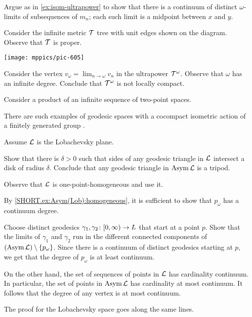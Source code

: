 Argue as in \ref{ex:isom-ultrapower} to show that there is a continuum of distinct $\omega$-limits of subsequences of $m_n$;
each such limit is a midpoint between $x$ and $y$.

 Consider the infinite metric $\mathcal{T}$ tree with unit edges shown
on the diagram.
Observe that $\mathcal{T}$ is proper.

\begin{Figure}
\vskip-0mm
\centering
\texttt{[image: mppics/pic-605]}
\end{Figure}

Consider the vertex $v_\omega=\lim_{n\to\omega}v_n$ in the ultrapower $\mathcal{T}^\omega$.
Observe that $\omega$ has an infinite degree.
Conclude that $\mathcal{T}^\omega$ is not locally compact.

Consider a product of an infinite sequence of two-point spaces.

There are such examples of geodesic spaces with a cocompact isometric action of a finitely generated group \cite{thomas-velickovic}.

 Assume $\mathcal{L}$ is the Lobachevsky plane.

Show that there is $\delta>0$ such that sides of any geodesic triangle in $\mathcal{L}$ intersect a disk of radius $\delta$.
Conclude that any geodesic triangle in $\mathop{\rm Asym}\nolimits\mathcal{L}$ is a tripod.

 Observe that $\mathcal{L}$ is one-point-homogeneous and use it.

By \ref{SHORT.ex:Asym(Lob):homogeneous}, it is sufficient to show that $p_\omega$ has a continuum degree.

Choose distinct geodesics $\gamma_1,\gamma_2\:[0,\infty)\z\to L$ that start at a point $p$.
Show that the limits of $\gamma_1$ and $\gamma_2$ run in the different connected components of $(\mathop{\rm Asym}\nolimits\mathcal{L})\setminus \{p_\omega\}$.
Since there is a continuum of distinct geodesics starting at $p$,
we get that the degree of $p_\omega$ is at least continuum.

On the other hand, the set of sequences of points in $\mathcal{L}$  has cardinality continuum.
In particular, the set of points in $\mathop{\rm Asym}\nolimits\mathcal{L}$ has cardinality at most continuum.
It follows that the degree of any vertex is at most continuum.

The proof for the Lobachevsky space goes along the same lines.

